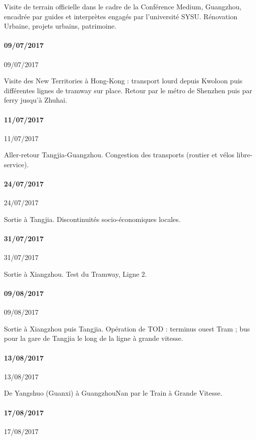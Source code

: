 Visite de terrain officielle dans le cadre de la Conférence Medium, Guangzhou, encadrée par guides et interprètes engagés par l'université SYSU. Rénovation Urbaine, projets urbains, patrimoine.


\paragraph{09/07/2017}{09/07/2017}

Visite des New Territories à Hong-Kong : transport lourd depuis Kwoloon puis différentes lignes de tramway sur place. Retour par le métro de Shenzhen puis par ferry jusqu'à Zhuhai. 


\paragraph{11/07/2017}{11/07/2017}

Aller-retour Tangjia-Guangzhou. Congestion des transports (routier et vélos libre-service).


\paragraph{24/07/2017}{24/07/2017}


Sortie à Tangjia. Discontinuités socio-économiques locales.


\paragraph{31/07/2017}{31/07/2017}

Sortie à Xiangzhou. Test du Tramway, Ligne 2.



\paragraph{09/08/2017}{09/08/2017}

Sortie à Xiangzhou puis Tangjia. Opération de TOD : terminus ouest Tram ; bus pour la gare de Tangjia le long de la ligne à grande vitesse.


\paragraph{13/08/2017}{13/08/2017}

De Yangshuo (Guanxi) à GuangzhouNan par le Train à Grande Vitesse.




\paragraph{17/08/2017}{17/08/2017}


